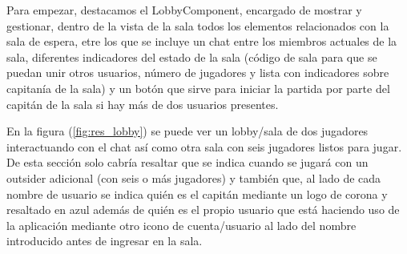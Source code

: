 Para empezar, destacamos el LobbyComponent, encargado de mostrar y gestionar, dentro de la vista de la sala todos los elementos relacionados con la sala de espera, etre los que se
incluye un chat entre los miembros actuales de la sala, diferentes indicadores del estado de la sala (código de sala para que se puedan unir otros usuarios, número de jugadores y
lista con indicadores sobre capitanía de la sala) y un botón que sirve para iniciar la partida por parte del capitán de la sala si hay más de dos usuarios presentes.

En la figura (\ref{fig:res_lobby}) se puede ver un lobby/sala de dos jugadores interactuando con el chat así como otra sala con seis jugadores listos para jugar. De esta sección solo
cabría resaltar que se indica cuando se jugará con un outsider adicional (con seis o más jugadores) y también que, al lado de cada nombre de usuario se indica quién es el capitán mediante
un logo de corona y resaltado en azul además de quién es el propio usuario que está haciendo uso de la aplicación mediante otro icono de cuenta/usuario al lado del nombre introducido
antes de ingresar en la sala.

